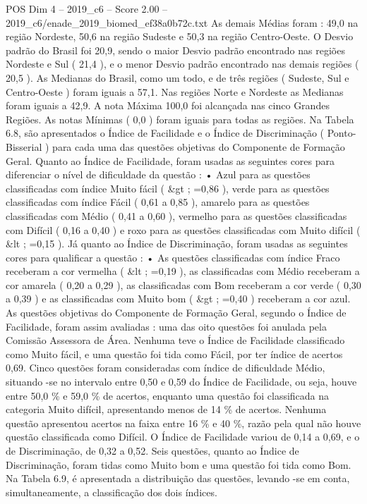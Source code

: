\begin{textsample}{POS Dim 4 – 2019\_c6 – Score 2.00 – 2019\_c6/enade\_2019\_biomed\_ef38a0b72c.txt}
As demais Médias foram : 49,0 na região Nordeste, 50,6 na região Sudeste e 50,3 na região Centro-Oeste.
O Desvio padrão do Brasil foi 20,9, sendo o maior Desvio padrão encontrado nas regiões Nordeste e Sul ( 21,4 ), e o menor Desvio padrão encontrado nas demais regiões ( 20,5 ).
As Medianas do Brasil, como um todo, e de três regiões ( Sudeste, Sul e Centro-Oeste ) foram iguais a 57,1.
Nas regiões Norte e Nordeste as Medianas foram iguais a 42,9.
A nota Máxima 100,0 foi alcançada nas cinco Grandes Regiões.
As notas Mínimas ( 0,0 ) foram iguais para todas as regiões.
Na Tabela 6.8, são apresentados o Índice de Facilidade e o Índice de Discriminação ( Ponto-Bisserial ) para cada uma das questões objetivas do Componente de Formação Geral.
Quanto ao Índice de Facilidade, foram usadas as seguintes cores para diferenciar o nível de dificuldade da questão : • Azul para as questões classificadas com índice Muito fácil ( \&gt ; =0,86 ), verde para as questões classificadas com índice Fácil ( 0,61 a 0,85 ), amarelo para as questões classificadas com Médio ( 0,41 a 0,60 ), vermelho para as questões classificadas com Difícil ( 0,16 a 0,40 ) e roxo para as questões classificadas com Muito difícil ( \&lt ; =0,15 ).
Já quanto ao Índice de Discriminação, foram usadas as seguintes cores para qualificar a questão : • As questões classificadas com índice Fraco receberam a cor vermelha ( \&lt ; =0,19 ), as classificadas com Médio receberam a cor amarela ( 0,20 a 0,29 ), as classificadas com Bom receberam a cor verde ( 0,30 a 0,39 ) e as classificadas com Muito bom ( \&gt ; =0,40 ) receberam a cor azul.
As questões objetivas do Componente de Formação Geral, segundo o Índice de Facilidade, foram assim avaliadas : uma das oito questões foi anulada pela Comissão Assessora de Área.
Nenhuma teve o Índice de Facilidade classificado como Muito fácil, e uma questão foi tida como Fácil, por ter índice de acertos 0,69.
Cinco questões foram consideradas com índice de dificuldade Médio, situando -se no intervalo entre 0,50 e 0,59 do Índice de Facilidade, ou seja, houve entre 50,0 \% e 59,0 \% de acertos, enquanto uma questão foi classificada na categoria Muito difícil, apresentando menos de 14 \% de acertos.
Nenhuma questão apresentou acertos na faixa entre 16 \% e 40 \%, razão pela qual não houve questão classificada como Difícil.
O Índice de Facilidade variou de 0,14 a 0,69, e o de Discriminação, de 0,32 a 0,52.
Seis questões, quanto ao Índice de Discriminação, foram tidas como Muito bom e uma questão foi tida como Bom.
Na Tabela 6.9, é apresentada a distribuição das questões, levando -se em conta, simultaneamente, a classificação dos dois índices.

\end{textsample}

